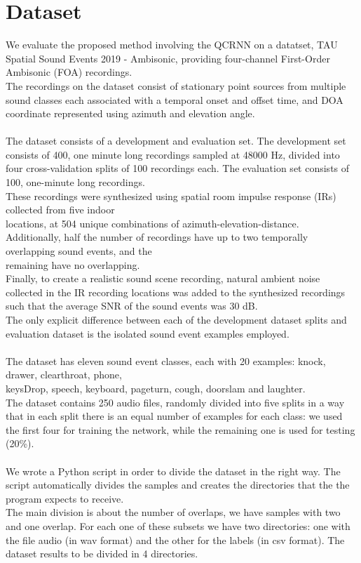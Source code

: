 \documentclass{article}
\begin{document}
    \section{Dataset}
    We evaluate the proposed method involving the QCRNN on a datatset, TAU Spatial Sound Events 2019 - Ambisonic, providing 
    four-channel First-Order Ambisonic (FOA) recordings.\\
    The recordings on the dataset consist of stationary point sources from multiple sound classes each associated with a temporal 
    onset and offset time, and DOA coordinate represented using azimuth and elevation angle.\\
    \\ The dataset consists of a development and evaluation set.  The development set consists of 400, one minute long recordings 
    sampled at 48000 Hz, divided into four cross-validation splits of 100 recordings each. The evaluation set consists of 100, 
    one-minute long recordings.\\
    These recordings were synthesized using spatial room impulse response (IRs) collected from five indoor \\ locations, at 504 unique 
    combinations of azimuth-elevation-distance. \\
    Additionally, half the number of recordings have up to two temporally overlapping sound events, and the \\remaining have no 
    overlapping.\\
    Finally, to create a realistic sound scene recording, natural ambient noise collected in the IR recording locations was added 
    to the synthesized recordings such that the average SNR of the sound events was 30 dB.\\
    The only explicit difference between each of the development dataset splits and evaluation dataset is the isolated sound event 
    examples employed.\\
    \\ The dataset has eleven sound event classes, each with 20 examples: knock, drawer, clearthroat, phone, \\ keysDrop, speech, 
    keyboard, pageturn, cough, doorslam and laughter.\\
    The dataset contains 250 audio files, randomly divided into five splits in a way that in each split there is an equal number 
    of examples for each class: we used the first four for training the network, while the remaining one is used for testing (20\%).
    \\ \\ We wrote a Python script in order to divide the dataset in the right way. The script automatically divides the samples 
    and creates the directories that the the program expects to receive.
    \\ The main division is about the number of overlaps, we have samples with two and one overlap. For each one of these subsets we 
    have two directories: one with the file audio (in wav format) and the other for the labels (in csv format). The dataset results 
    to be divided in 4 directories. 
\end{document}
